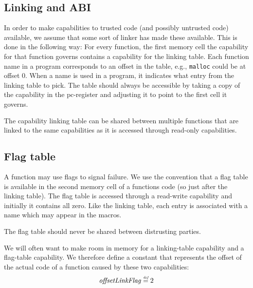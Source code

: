 \documentclass[a4paper]{article}
\newcommand{\defeq}{\stackrel{\textit{\tiny{def}}}{=}}
\newcommand{\var}[1]{\mathit{#1}}
\newcommand{\pcreg}{\mathrm{pc}}
\newcommand{\olf}{\var{offsetLinkFlag}}
\begin{document}
              \subsection{Linking and ABI}
              In order to make capabilities to trusted code (and possibly untrusted code) available, we assume that some sort of linker has made these available. This is done in the following way: For every function, the first memory cell the capability for that function governs contains a capability for the linking table. Each function name in a program corresponds to an offset in the table, e.g., \texttt{malloc} could be at offset 0. When a name is used in a program, it indicates what entry from the linking table to pick. The table should always be accessible by taking a copy of the capability in the $\pcreg$-register and adjusting it to point to the first cell it governs.

              The capability linking table can be shared between multiple functions that are linked to the same capabilities as it is accessed through read-only capabilities.

              \subsection{Flag table}
              A function may use flags to signal failure. We use the convention that a flag table is available in the second memory cell of a functions code (so just after the linking table). The flag table is accessed through a read-write capability and initially it contains all zero. Like the linking table, each entry is associated with a name which may appear in the macros.

              The flag table should never be shared between distrusting parties.

              We will often want to make room in memory for a linking-table capability and a flag-table capability. We therefore define a constant that represents the offset of the actual code of a function caused by these two capabilities:
              \[
                \olf \defeq 2
              \]
\end{document}

